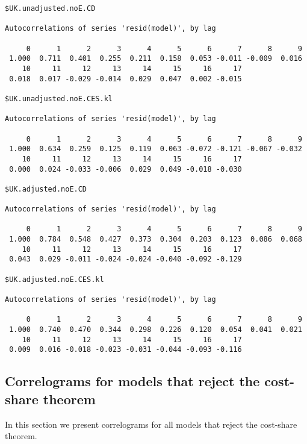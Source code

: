 \documentclass[preprint,authoryear,12pt]{elsarticle}\usepackage[]{graphicx}\usepackage[]{color}
\makeatletter
\newenvironment{kframe}{%
 \def\at@end@of@kframe{}%
 \ifinner\ifhmode%
  \def\at@end@of@kframe{\end{minipage}}%
  \begin{minipage}{\columnwidth}%
 \fi\fi%
 \def\FrameCommand##1{\hskip\@totalleftmargin \hskip-\fboxsep
 \colorbox{shadecolor}{##1}\hskip-\fboxsep
     \hskip-\linewidth \hskip-\@totalleftmargin \hskip\columnwidth}%
 \MakeFramed {\advance\hsize-\width
   \@totalleftmargin\z@ \linewidth\hsize
   \@setminipage}}%
 {\par\unskip\endMakeFramed%
 \at@end@of@kframe}
\newenvironment{knitrout}{}{} %
\makeatother
\begin{document}
\begin{knitrout}
\begin{kframe}
\begin{verbatim}
$UK.unadjusted.noE.CD

Autocorrelations of series 'resid(model)', by lag

     0      1      2      3      4      5      6      7      8      9 
 1.000  0.711  0.401  0.255  0.211  0.158  0.053 -0.011 -0.009  0.016 
    10     11     12     13     14     15     16     17 
 0.018  0.017 -0.029 -0.014  0.029  0.047  0.002 -0.015 

$UK.unadjusted.noE.CES.kl

Autocorrelations of series 'resid(model)', by lag

     0      1      2      3      4      5      6      7      8      9 
 1.000  0.634  0.259  0.125  0.119  0.063 -0.072 -0.121 -0.067 -0.032 
    10     11     12     13     14     15     16     17 
 0.000  0.024 -0.033 -0.006  0.029  0.049 -0.018 -0.030 

$UK.adjusted.noE.CD

Autocorrelations of series 'resid(model)', by lag

     0      1      2      3      4      5      6      7      8      9 
 1.000  0.784  0.548  0.427  0.373  0.304  0.203  0.123  0.086  0.068 
    10     11     12     13     14     15     16     17 
 0.043  0.029 -0.011 -0.024 -0.024 -0.040 -0.092 -0.129 

$UK.adjusted.noE.CES.kl

Autocorrelations of series 'resid(model)', by lag

     0      1      2      3      4      5      6      7      8      9 
 1.000  0.740  0.470  0.344  0.298  0.226  0.120  0.054  0.041  0.021 
    10     11     12     13     14     15     16     17 
 0.009  0.016 -0.018 -0.023 -0.031 -0.044 -0.093 -0.116 
\end{verbatim}
\end{kframe}
\end{knitrout}


\subsection{Correlograms for models that reject the cost-share theorem} 
\label{sec:correlograms_noCST}

In this section we present correlograms for all models that reject the cost-share theorem.
\end{document}
